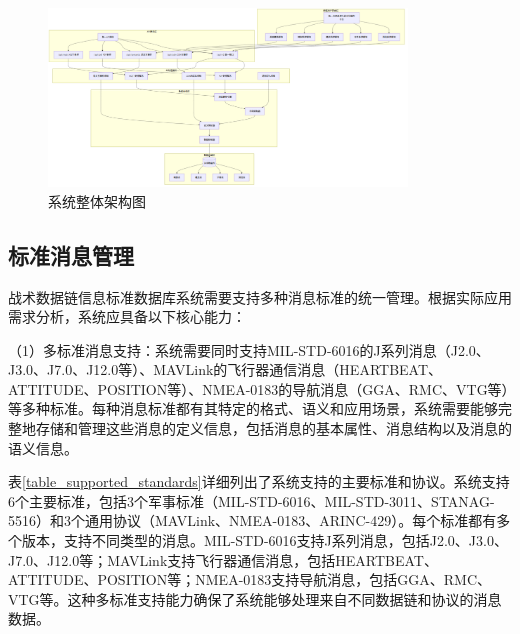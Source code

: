 \begin{figure}[H]
    \centering
    \includegraphics[width=0.85\textwidth,height=0.7\textheight,keepaspectratio]{chapters/fig-0/system_architecture.png}
    \caption{系统整体架构图}
    \label{fig_system_architecture}
\end{figure}

\subsection{标准消息管理}
战术数据链信息标准数据库系统需要支持多种消息标准的统一管理\cite{CurtissWright_TCG_HUNTR_2020}。根据实际应用需求分析，系统应具备以下核心能力：

（1）多标准消息支持：系统需要同时支持MIL-STD-6016的J系列消息（J2.0、J3.0、J7.0、J12.0等）、MAVLink的飞行器通信消息（HEARTBEAT、ATTITUDE、POSITION等）、NMEA-0183的导航消息（GGA、RMC、VTG等）等多种标准。每种消息标准都有其特定的格式、语义和应用场景，系统需要能够完整地存储和管理这些消息的定义信息，包括消息的基本属性、消息结构以及消息的语义信息。

表\ref{table_supported_standards}详细列出了系统支持的主要标准和协议。系统支持6个主要标准，包括3个军事标准（MIL-STD-6016、MIL-STD-3011、STANAG-5516）和3个通用协议（MAVLink、NMEA-0183、ARINC-429）。每个标准都有多个版本，支持不同类型的消息。MIL-STD-6016支持J系列消息，包括J2.0、J3.0、J7.0、J12.0等；MAVLink支持飞行器通信消息，包括HEARTBEAT、ATTITUDE、POSITION等；NMEA-0183支持导航消息，包括GGA、RMC、VTG等。这种多标准支持能力确保了系统能够处理来自不同数据链和协议的消息数据。

